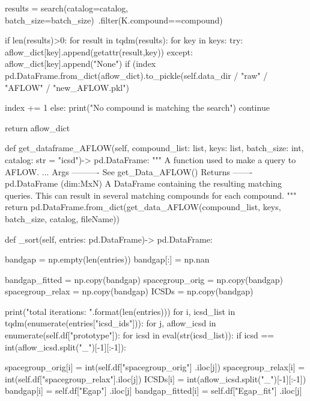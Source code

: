             results = search(catalog=catalog, batch_size=batch_size)\
                .filter(K.compound==compound)

            if len(results)>0:
                for result in tqdm(results):
                    for key in keys:
                        try:
                            aflow_dict[key].append(getattr(result,key))
                        except:
                            aflow_dict[key].append("None")
                    if (index %
                        pd.DataFrame.from_dict(aflow_dict).to_pickle(self.data_dir / "raw"  / "AFLOW" / "new_AFLOW.pkl")

                    index += 1
            else:
                print("No compound is matching the search")
                continue

        return aflow_dict

    def get_dataframe_AFLOW(self, compound_list: list, keys: list, batch_size: int, catalog: str = "icsd")-> pd.DataFrame:
        """
        A function used to make a query to AFLOW.
        ...
        Args
        ----------
        See get_Data_AFLOW()
        Returns
        -------
        pd.DataFrame (dim:MxN)
            A DataFrame containing the resulting matching queries. This can result
            in several matching compounds for each compound.
        """
        return pd.DataFrame.from_dict(get_data_AFLOW(compound_list, keys, batch_size, catalog, fileName))

    def _sort(self, entries: pd.DataFrame)-> pd.DataFrame:

        bandgap    = np.empty(len(entries))
        bandgap[:] = np.nan

        bandgap_fitted    = np.copy(bandgap)
        spacegroup_orig   = np.copy(bandgap)
        spacegroup_relax  = np.copy(bandgap)
        ICSDs    = np.copy(bandgap)

        print("total iterations: {}".format(len(entries)))
        for i, icsd_list in tqdm(enumerate(entries["icsd_ids"])):
            for j, aflow_icsd in enumerate(self.df["prototype"]):
                for icsd in eval(str(icsd_list)):
                    if icsd == int(aflow_icsd.split("_")[-1][:-1]):

                        spacegroup_orig[i]  = int(self.df["spacegroup_orig"] .iloc[j])
                        spacegroup_relax[i] = int(self.df["spacegroup_relax"].iloc[j])
                        ICSDs[i]             = int(aflow_icsd.split("_")[-1][:-1])
                        bandgap[i]        = self.df["Egap"]     .iloc[j]
                        bandgap_fitted[i] = self.df["Egap_fit"] .iloc[j]

